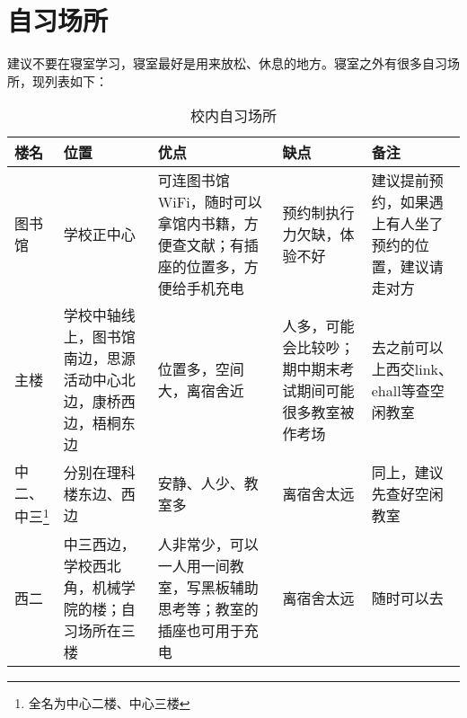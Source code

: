 \section{自习场所}
建议不要在寝室学习，寝室最好是用来放松、休息的地方。寝室之外有很多自习场所，现列表如下：
\begin{table}[h]
    \begin{tabular}{l|p{3cm}|p{3cm}|p{3cm}|p{3cm}}
        \hline
        \hline
        楼名   & 位置  & 优点    &    缺点  &  备注\\ \hline
        图书馆 & 学校正中心             &可连图书馆WiFi，随时可以拿馆内书籍，方便查文献；有插座的位置多，方便给手机充电
                & 预约制执行力欠缺，体验不好 & 建议提前预约，如果遇上有人坐了预约的位置，建议请走对方\\ \hline
        主楼  & 学校中轴线上，图书馆南边，思源活动中心北边，康桥西边，梧桐东边 &位置多，空间大，离宿舍近
                & 人多，可能会比较吵；期中期末考试期间可能很多教室被作考场  &  去之前可以上西交link、ehall等查空闲教室\\ \hline
        中二、中三\footnote{全名为中心二楼、中心三楼} & 分别在理科楼东边、西边 & 安静、人少、教室多 
                & 离宿舍太远    & 同上，建议先查好空闲教室 \\ \hline
        西二  &  中三西边，学校西北角，机械学院的楼；自习场所在三楼  &  人非常少，可以一人用一间教室，写黑板辅助思考等；教室的插座也可用于充电 
                & 离宿舍太远    & 随时可以去 \\
        \hline
        \hline
    \end{tabular}
    \caption{校内自习场所}
\end{table}